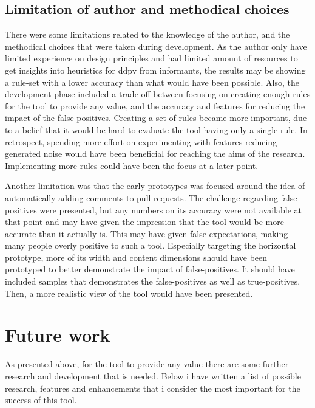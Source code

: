 \documentclass{report}
\begin{document}


\subsection*{Limitation of author and methodical choices}
There were some limitations related to the knowledge of the author, and the methodical choices that were taken during development. As the author only have limited experience on design principles and had limited amount of resources to get insights into heuristics for \gls{ddpv} from informants, the results may be showing a rule-set with a lower accuracy than what would have been possible. Also, the development phase included a trade-off between focusing on creating enough rules for the tool to provide any value, and the accuracy and features for reducing the impact of the false-positives. Creating a set of rules became more important, due to a belief that it would be hard to evaluate the tool having only a single rule. In retrospect, spending more effort on experimenting with features reducing generated noise would have been beneficial for reaching the aims of the research. Implementing more rules could have been the focus at a later point. 

Another limitation was that the early prototypes was focused around the idea of automatically adding comments to pull-requests. The challenge regarding false-positives were presented, but any numbers on its accuracy were not available at that point and may have given the impression that the tool would be more accurate than it actually is. This may have given false-expectations, making many people overly positive to such a tool. Especially targeting the horizontal prototype, more of its width and content dimensions should have been prototyped to better demonstrate the impact of false-positives. It should have included samples that demonstrates the false-positives as well as true-positives. Then, a more realistic view of the tool would have been presented.

\section{Future work}
 As presented above, for the tool to provide any value there are some further research and development that is needed. Below i have written a list of possible research, features and enhancements that i consider the most important for the success of this tool. 
 
\end{document}
